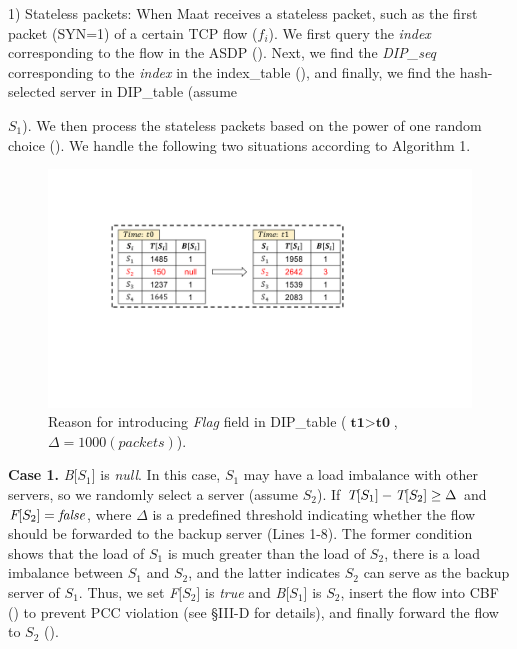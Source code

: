 1) Stateless packets: When Maat receives a stateless packet, such as the first packet (SYN=1) of a certain TCP flow (\emph{$f_i$}). We first query the \emph{index} corresponding to the flow in the ASDP (). Next, we find the \emph{DIP_seq} corresponding to the \emph{index} in the index\_table (), and finally, we find the hash-selected server in DIP\_table (assume {\emph{$S_1$}). We then process the stateless packets based on the power of one random choice (). We handle the following two situations according to Algorithm 1.
	
\begin{figure}[t]
	\setlength{\abovecaptionskip}{0pt}
	\setlength{\belowcaptionskip}{-10pt}
	\centering
	\includegraphics[width=1\linewidth]{figure/flag.pdf}
	\caption{Reason for introducing \emph{Flag} field in DIP_table ($\textbf{t1} > \textbf{t0}$, $\Delta = 1000 (packets)$).}
	\label{6}
\end{figure}

\textbf{Case 1.} \emph{B}[\emph{$S_1$}] is \emph{null}. In this case, \emph{$S_1$} may have a load imbalance with other servers, so we randomly select a server (assume \emph{$S_2$}). If $\emph{T}[\emph{$S_1$}] - \emph{T}[\emph{$S_2$}] \geq \Delta$ and $\emph{F}[\emph{$S_2$}] = \emph{false}$, where $\Delta$ is a predefined threshold indicating whether the flow should be forwarded to the backup server (Lines 1-8). The former condition shows that the load of \emph{$S_1$} is much greater than the load of \emph{$S_2$}, there is a load imbalance between \emph{$S_1$} and \emph{$S_2$}, and the latter indicates \emph{$S_2$} can serve as the backup server of \emph{$S_1$}. Thus, we set \emph{F}[\emph{$S_2$}] is \emph{true} and \emph{B}[\emph{$S_1$}] is \emph{$S_2$}, insert the flow into CBF () to prevent PCC violation (see \S III-D for details), and finally forward the flow to \emph{$ S_2$} (). 

}
